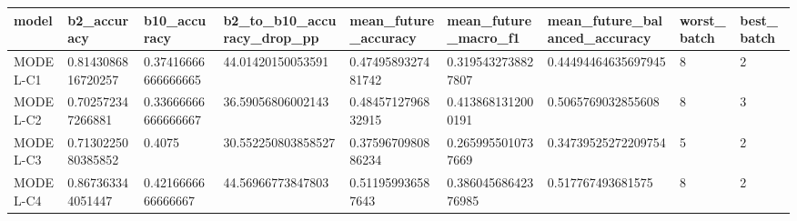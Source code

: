 \begin{tabular}{lllllllll}
 \hline
model & b2\_accuracy & b10\_accuracy & b2\_to\_b10\_accuracy\_drop\_pp & mean\_future\_accuracy & mean\_future\_macro\_f1 & mean\_future\_balanced\_accuracy & worst\_batch & best\_batch \\
 \hline
MODEL-C1 & 0.8143086816720257 & 0.37416666666666665 & 44.01420150053591 & 0.4749589327481742 & 0.3195432738827807 & 0.44494464635697945 & 8 & 2 \\
MODEL-C2 & 0.702572347266881 & 0.33666666666666667 & 36.59056806002143 & 0.4845712796832915 & 0.4138681312000191 & 0.5065769032855608 & 8 & 3 \\
MODEL-C3 & 0.7130225080385852 & 0.4075 & 30.552250803858527 & 0.3759670980886234 & 0.2659955010737669 & 0.34739525272209754 & 5 & 2 \\
MODEL-C4 & 0.867363344051447 & 0.4216666666666667 & 44.56966773847803 & 0.511959936587643 & 0.38604568642376985 & 0.517767493681575 & 8 & 2 \\
 \hline
\end{tabular}
